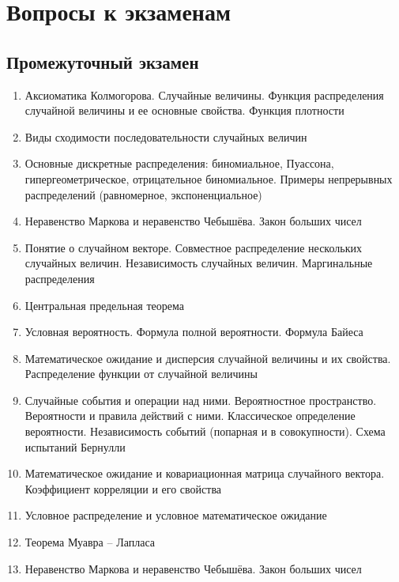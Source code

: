 \newpage
\thispagestyle{empty}
\section{Вопросы к экзаменам}

\subsection*{Промежуточный экзамен}

\begin{enumerate}
	\item Аксиоматика Колмогорова. Случайные величины. Функция распределения случайной величины и ее основные свойства. Функция плотности
	\item Виды сходимости последовательности случайных величин
	\item Основные дискретные распределения: биномиальное, Пуассона, гипергеометрическое, отрицательное биномиальное. Примеры непрерывных распределений (равномерное, экспоненциальное)
	\item Неравенство Маркова и неравенство Чебышёва. Закон больших чисел
	\item Понятие о случайном векторе. Совместное распределение нескольких случайных величин. Независимость случайных величин. Маргинальные распределения
	\item Центральная предельная теорема
	\item Условная вероятность. Формула полной вероятности. Формула Байеса
	\item Математическое ожидание и дисперсия случайной величины и их свойства. Распределение функции от случайной величины
	\item Случайные события и операции над ними. Вероятностное пространство. Вероятности и правила действий с ними. Классическое определение вероятности. Независимость событий (попарная и в совокупности). Схема испытаний Бернулли
	\item Математическое ожидание и ковариационная матрица случайного вектора. Коэффициент корреляции и его свойства
	\item Условное распределение и условное математическое ожидание
	\item Теорема Муавра – Лапласа
	\item Неравенство Маркова и неравенство Чебышёва. Закон больших чисел
\end{enumerate}

